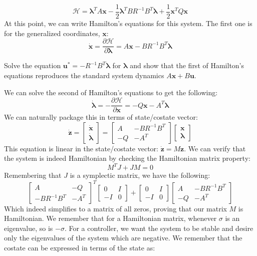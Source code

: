 $$\mathcal{H}=\bm{\lambda}^TA\bm{x}-\frac{1}{2}\bm{\lambda}^TBR^{-1}B^T\bm{\lambda}+\frac{1}{2}\bm{x}^TQ\bm{x}$$
At this point, we can write Hamilton's equations for this system. The first one is for the generalized coordinates, $\bm{x}$:
$$\bm{\dot{x}}=\frac{\partial\mathcal{H}}{\partial \bm{\lambda}}=A\bm{x}-BR^{-1}B^T\bm{\lambda} $$
\begin{exercise}
Solve the equation $\bm{u}^*=-R^{-1}B^T\bm{\lambda}$ for $\bm{\lambda}$ and show that the first of Hamilton's equations reproduces the standard system dynamics $A\bm{x}+B\bm{u}$.
\end{exercise}
We can solve the second of Hamilton's equations to get the following:
$$\bm{\dot{\lambda}}=-\frac{\partial\mathcal{H}}{\partial \bm{x}}=-Q\bm{x}-A^T\bm{\lambda}$$
We can naturally package this in terms of state/costate vector:
$$\bm{\dot{z}}=\begin{bmatrix}
    \bm{\dot{x}}\\\bm{\dot{\lambda}}
\end{bmatrix}=\begin{bmatrix}
    A&-BR^{-1}B^T\\-Q&-A^T
\end{bmatrix}\begin{bmatrix}
    \bm{x}\\\bm{\lambda}
\end{bmatrix}$$
This equation is linear in the state/costate vector: $\bm{\dot{z}}=M\bm{z}$. We can verify that the system is indeed \gls{Hamiltonian} by checking the \gls{Hamiltonian} matrix property:
$$M^TJ+JM=0$$
Remembering that $J$ is a symplectic matrix, we have the following:
$$\begin{bmatrix}
    A&-Q\\-BR^{-1}B^T&-A^T
\end{bmatrix}^T\begin{bmatrix}
    0&I\\-I&0
\end{bmatrix}+\begin{bmatrix}
    0&I\\-I&0
\end{bmatrix}\begin{bmatrix}
    A&-BR^{-1}B^T\\-Q&-A^T
\end{bmatrix}$$
Which indeed simplifies to a matrix of all zeros, proving that our matrix $M$ is \gls{Hamiltonian}. We remember that for a \gls{Hamiltonian} matrix, whenever $\sigma$ is an eigenvalue, so is $-\sigma$. For a controller, we want the system to be stable and desire only the eigenvalues of the system which are negative. We remember that the costate can be expressed in terms of the state as:
